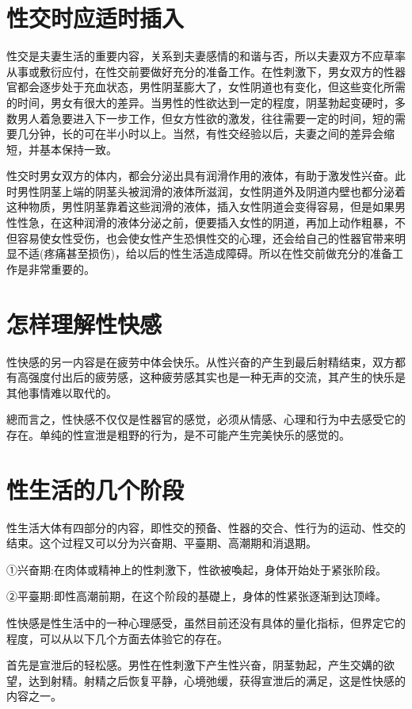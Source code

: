 \documentclass[12pt,UTF8]{ctexbook}
\begin{document}
\section{性交时应适时插入}

性交是夫妻生活的重要内容，关系到夫妻感情的和谐与否，所以夫妻双方不应草率从事或敷衍应付，在性交前要做好充分的准备工作。在性刺激下，男女双方的性器官都会逐步处于充血状态，男性阴茎膨大了，女性阴道也有变化，但这些变化所需的时间，男女有很大的差异。当男性的性欲达到一定的程度，阴茎勃起变硬时，多数男人着急要进入下一步工作，但女方性欲的激发，往往需要一定的时间，短的需要几分钟，长的可在半小时以上。当然，有性交经验以后，夫妻之间的差异会缩短，并基本保持一致。

性交时男女双方的体内，都会分泌出具有润滑作用的液体，有助于激发性兴奋。此时男性阴茎上端的阴茎头被润滑的液体所滋润，女性阴道外及阴道内壁也都分泌着这种物质，男性阴茎靠着这些润滑的液体，插入女性阴道会变得容易，但是如果男性性急，在这种润滑的液体分泌之前，便要插入女性的阴道，再加上动作粗暴，不但容易使女性受伤，也会使女性产生恐惧性交的心理，还会给自己的性器官带来明显不适(疼痛甚至损伤)，给以后的性生活造成障碍。所以在性交前做充分的准备工作是非常重要的。

\section{怎样理解性快感}

性快感的另一内容是在疲劳中体会快乐。从性兴奋的产生到最后射精结束，双方都有高强度付出后的疲劳感，这种疲劳感其实也是一种无声的交流，其产生的快乐是其他事情难以取代的。

總而言之，性快感不仅仅是性器官的感觉，必须从情感、心理和行为中去感受它的存在。单纯的性宣泄是粗野的行为，是不可能产生完美快乐的感觉的。

\section{性生活的几个阶段}

性生活大体有四部分的内容，即性交的预备、性器的交合、性行为的运动、性交的结束。这个过程又可以分为兴奋期、平臺期、高潮期和消退期。

①兴奋期:在肉体或精神上的性刺激下，性欲被喚起，身体开始处于紧张阶段。

②平臺期:即性高潮前期，在这个阶段的基礎上，身体的性紧张逐渐到达顶峰。


性快感是性生活中的一种心理感受，虽然目前还没有具体的量化指标，但界定它的程度，可以从以下几个方面去体验它的存在。

首先是宣泄后的轻松感。男性在性刺激下产生性兴奋，阴茎勃起，产生交媾的欲望，达到射精。射精之后恢复平静，心境弛缓，获得宣泄后的满足，这是性快感的内容之一。
\end{document}
